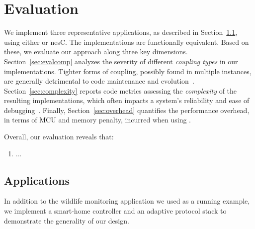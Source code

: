 \section{Evaluation}\label{sec:eval}

We implement three representative applications, as described in
Section~\ref{sec:scenarios}, using either \conesc or nesC. The
implementations are functionally equivalent. Based on these, we
evaluate our approach along three key
dimensions. Section~\ref{sec:evalcomp} analyzes the severity of
different \emph{coupling types} in our implementations. Tighter forms
of coupling, possibly found in multiple instances, are generally
detrimental to code maintenance and
evolution~\cite{stevens79}. Section~\ref{sec:complexity} reports code
metrics assessing the \emph{complexity} of the resulting
implementations, which often impacts a system's reliability and ease
of debugging~\cite{pressman01}. Finally, Section~\ref{sec:overhead}
quantifies the performance overhead, in terms of MCU and memory
penalty, incurred when using \conesc.

Overall, our evaluation reveals that:
\begin{enumerate}
\item ...
\end{enumerate}


\subsection{Applications}\label{sec:scenarios}

In addition to the wildlife monitoring application we used as a
running example, we implement a smart-home controller and an adaptive
protocol stack to demonstrate the generality of our design.

